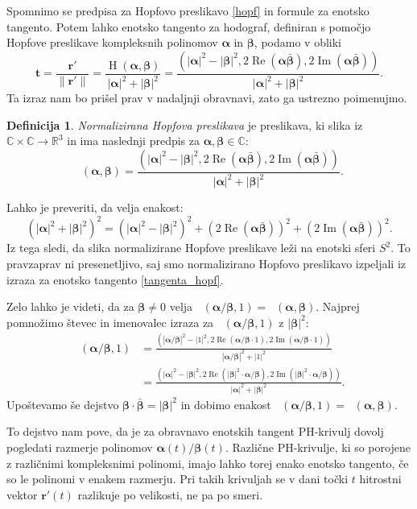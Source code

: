 \documentclass[12pt,a4paper,twoside]{article}
\theoremstyle{definition} %
\newtheorem{definicija}{Definicija}[section]
\theoremstyle{plain} %
\theoremstyle{primerstyle}
\numberwithin{equation}{section}  %
\newcommand{\R}{\mathbb R}
\renewcommand{\C}{\mathbb C}
\newcommand{\tV}{\mathbf{t}}
\newcommand{\rV}{\mathbf{r}}
\newcommand{\balpha}{\boldsymbol \alpha}
\newcommand{\bbeta}{\boldsymbol \beta}
\DeclareMathOperator{\hopf}{H}
\DeclareMathOperator{\ReC}{Re}
\DeclareMathOperator{\ImC}{Im}
\DeclareMathOperator{\nhopf}{\hat{H}}
\begin{document}
Spomnimo se predpisa za Hopfovo preslikavo \eqref{hopf} in formule za enotsko tangento. Potem lahko enotsko tangento za hodograf, definiran s pomočjo Hopfove preslikave kompleksnih polinomov $\balpha$ in $\bbeta$, podamo v obliki
\begin{equation}
	\label{tangenta_hopf}
	\tV=\frac{\rV'}{\lVert\rV'\rVert}=\frac{\hopf(\balpha,\bbeta)}{|\balpha|^2+|\bbeta|^2}=\frac{(|\balpha|^2-|\bbeta|^2,2\ReC(\balpha\bar{\bbeta}),2\ImC(\balpha\bar{\bbeta}))}{|\balpha|^2+|\bbeta|^2}.
\end{equation}
Ta izraz nam bo prišel prav v nadaljnji obravnavi, zato ga ustrezno poimenujmo.
\begin{definicija}
	\label{norm_hopf_def}
	\emph{Normalizirana Hopfova preslikava} je preslikava, ki slika iz $\C\times\C\to\R^3$ in ima naslednji predpis za $\balpha,\bbeta\in\C$:
	\begin{equation}
		\label{norm_hopf}
		\nhopf(\balpha,\bbeta)=\frac{(|\balpha|^2-|\bbeta|^2,2\ReC(\balpha\bar{\bbeta}),2\ImC(\balpha\bar{\bbeta}))}{|\balpha|^2+|\bbeta|^2}.
	\end{equation}
\end{definicija}
Lahko je preveriti, da velja enakost:
\begin{equation}
	(|\balpha|^2+|\bbeta|^2)^2=(|\balpha|^2-|\bbeta|^2)^2+(2\ReC(\balpha\bar{\bbeta}))^2+(2\ImC(\balpha\bar{\bbeta}))^2.
\end{equation}
Iz tega sledi, da slika normalizirane Hopfove preslikave leži na enotski sferi $S^2.$ To pravzaprav ni presenetljivo, saj smo normalizirano Hopfovo preslikavo izpeljali iz izraza za enotsko tangento \eqref{tangenta_hopf}.

Zelo lahko je videti, da za $\bbeta\neq0$ velja $\nhopf(\balpha/\bbeta,1)=\nhopf(\balpha,\bbeta).$ Najprej pomnožimo števec in imenovalec izraza za $\nhopf(\balpha/\bbeta,1)$ z $|\bbeta|^2$:
\begin{align*}
	\nhopf\left(\balpha/\bbeta,1\right)&=\frac{(|\balpha/\bbeta|^2-|1|^2,2\ReC(\balpha/\bbeta\cdot 1),2\ImC(\balpha/\bbeta\cdot 1))}{|\balpha/\bbeta|^2+|1|^2}\\
	&=\frac{(|\balpha|^2-|\bbeta|^2,2\ReC(|\bbeta|^2\cdot\balpha/\bbeta),2\ImC(|\bbeta|^2\cdot\balpha/\bbeta))}{|\balpha|^2+|\bbeta|^2}.
\end{align*}
Upoštevamo še dejstvo $\bbeta\cdot\bar{\bbeta}=|\bbeta|^2$ in dobimo enakost $\nhopf(\balpha/\bbeta,1)=\nhopf(\balpha,\bbeta).$

To dejstvo nam pove, da je za obravnavo enotskih tangent PH-krivulj dovolj pogledati razmerje polinomov $\balpha(t)/\bbeta(t).$ Različne PH-krivulje, ki so porojene z različnimi kompleksnimi polinomi, imajo lahko torej enako enotsko tangento, če so le polinomi v enakem razmerju. Pri takih krivuljah se v dani točki $t$ hitrostni vektor $\rV'(t)$ razlikuje po velikosti, ne pa po smeri.
\end{document}
